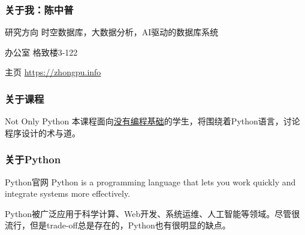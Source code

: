 \documentclass[aspectratio=169, 14pt]{beamer}
\begin{document}
\begin{frame}
	\frametitle{关于我：陈中普}

	\begin{block}{ 研究方向}
		时空数据库，大数据分析，AI驱动的数据库系统
	\end{block}

	\begin{block}{ 办公室}
		格致楼3-122
	\end{block}

	\begin{block}{ 主页}
		\href{https://zhongpu.info}{https://zhongpu.info}
	\end{block}

\end{frame}
\begin{frame}
	\frametitle{关于课程}
	\begin{block}{Not Only Python}
		本课程面向\underline{没有编程基础}的学生，将围绕着Python语言，讨论程序设计的\alert{术}与\alert{道}。
	\end{block}
\end{frame}

\begin{frame}
	\frametitle{关于Python}
	\begin{block}{Python官网}
		Python is a programming language that lets you work quickly and integrate systems more effectively.
	\end{block}
	\pause
	Python被广泛应用于\alert{科学计算}、\alert{Web开发}、\alert{系统运维}、\alert{人工智能}等领域。尽管很流行，但是\alert{trade-off}总是存在的，Python也有很明显的缺点。
\end{frame}
\end{document}
